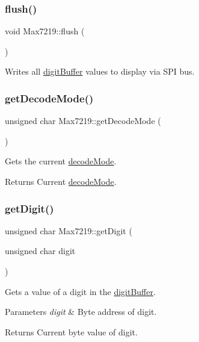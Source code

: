 \subsubsection{\texorpdfstring{flush()}{flush()}}
{\footnotesize\ttfamily void Max7219\+::flush (\begin{DoxyParamCaption}{ }\end{DoxyParamCaption})}

Writes all \hyperlink{classdrumpi_1_1Max7219_ab26f32728dd82c00e39b6212436f291e}{digit\+Buffer} values to display via S\+PI bus. \mbox{\label{classdrumpi_1_1Max7219_a78fc1bac71f62e85657a224f23af2189}} 
\subsubsection{\texorpdfstring{get\+Decode\+Mode()}{getDecodeMode()}}
{\footnotesize\ttfamily unsigned char Max7219\+::get\+Decode\+Mode (\begin{DoxyParamCaption}{ }\end{DoxyParamCaption})}

Gets the current \hyperlink{classdrumpi_1_1Max7219_a7ba5a789cdd1120814595b89ba4e99e0}{decode\+Mode}. \begin{DoxyReturn}{Returns}
Current \hyperlink{classdrumpi_1_1Max7219_a7ba5a789cdd1120814595b89ba4e99e0}{decode\+Mode}. 
\end{DoxyReturn}
\mbox{\label{classdrumpi_1_1Max7219_a30e98c660745c63d883696589b0e4f4f}} 
\subsubsection{\texorpdfstring{get\+Digit()}{getDigit()}}
{\footnotesize\ttfamily unsigned char Max7219\+::get\+Digit (\begin{DoxyParamCaption}\item[{unsigned char}]{digit }\end{DoxyParamCaption})}

Gets a value of a digit in the \hyperlink{classdrumpi_1_1Max7219_ab26f32728dd82c00e39b6212436f291e}{digit\+Buffer}. 
\begin{DoxyParams}{Parameters}
{\em digit} & Byte address of digit. \\
\hline
\end{DoxyParams}
\begin{DoxyReturn}{Returns}
Current byte value of digit. 
\end{DoxyReturn}
\mbox{\label{classdrumpi_1_1Max7219_aec71032f6aff755a3cf1a45183dceb96}} 
